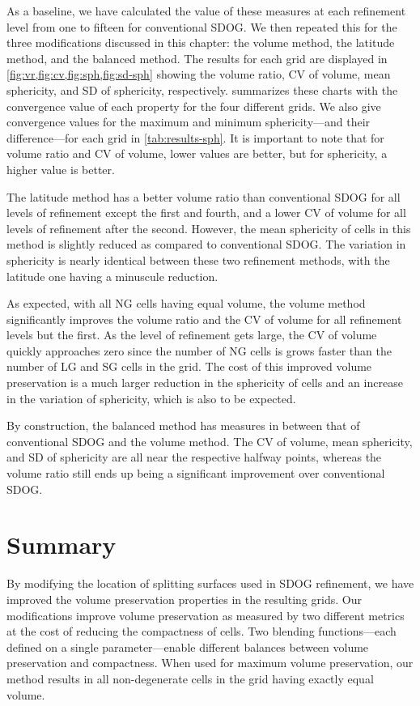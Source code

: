 As a baseline, we have calculated the value of these measures at each refinement level from one to fifteen for conventional SDOG.
We then repeated this for the three modifications discussed in this chapter: the volume method, the latitude method, and the balanced method.
The results for each grid are displayed in \cref{fig:vr,fig:cv,fig:sph,fig:sd-sph} showing the volume ratio, CV of volume, mean sphericity, and SD of sphericity, respectively.
 summarizes these charts with the convergence value of each property for the four different grids.
We also give convergence values for the maximum and minimum sphericity---and their difference---for each grid in \cref{tab:results-sph}.
It is important to note that for volume ratio and CV of volume, lower values are better, but for sphericity, a higher value is better.


The latitude method has a better volume ratio than conventional SDOG for all levels of refinement except the first and fourth, and a lower CV of volume for all levels of refinement after the second.
However, the mean sphericity of cells in this method is slightly reduced as compared to conventional SDOG.
The variation in sphericity is nearly identical between these two refinement methods, with the latitude one having a minuscule reduction.


As expected, with all NG cells having equal volume, the volume method significantly improves the volume ratio and the CV of volume for all refinement levels but the first.
As the level of refinement gets large, the CV of volume quickly approaches zero since the number of NG cells is grows faster than the number of LG and SG cells in the grid.
The cost of this improved volume preservation is a much larger reduction in the sphericity of cells and an increase in the variation of sphericity, which is also to be expected.


By construction, the balanced method has measures in between that of conventional SDOG and the volume method.
The CV of volume, mean sphericity, and SD of sphericity are all near the respective halfway points, whereas the volume ratio still ends up being a significant improvement over conventional SDOG.

\section{Summary}
By modifying the location of splitting surfaces used in SDOG refinement, we have improved the volume preservation properties in the resulting grids.
Our modifications improve volume preservation as measured by two different metrics at the cost of reducing the compactness of cells.
Two blending functions---each defined on a single parameter---enable different balances between volume preservation and compactness.
When used for maximum volume preservation, our method results in all non-degenerate cells in the grid having exactly equal volume.
